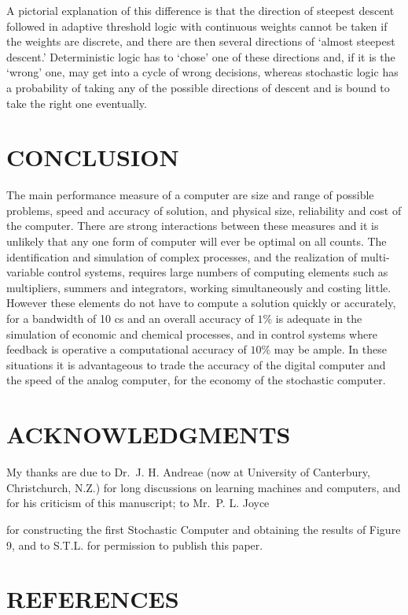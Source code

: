 \documentclass[
  10
]{article}
\begin{document}
A pictorial explanation of this difference is that the direction of
steepest descent followed in adaptive threshold logic with continuous
weights cannot be taken if the weights are discrete, and there are then
several directions of `almost steepest descent.' Deterministic logic has
to `chose' one of these directions and, if it is the `wrong' one, may
get into a cycle of wrong decisions, whereas stochastic logic has a
probability of taking any of the possible directions of descent and is
bound to take the right one eventually.

\section{CONCLUSION}\label{conclusion}

The main performance measure of a computer are size and range of
possible problems, speed and accuracy of solution, and physical size,
reliability and cost of the computer. There are strong interactions
between these measures and it is unlikely that any one form of computer
will ever be optimal on all counts. The identification and simulation of
complex processes, and the realization of multi-variable control
systems, requires large numbers of computing elements such as
multipliers, summers and integrators, working simultaneously and costing
little. However these elements do not have to compute a solution quickly
or accurately, for a bandwidth of 10 cs and an overall accuracy of
\(1\%\) is adequate in the simulation of economic and chemical
processes, and in control systems where feedback is operative a
computational accuracy of \(10\%\) may be ample. In these situations it
is advantageous to trade the accuracy of the digital computer and the
speed of the analog computer, for the economy of the stochastic
computer.

\section{ACKNOWLEDGMENTS}\label{acknowledgments}

My thanks are due to Dr.~J. H. Andreae (now at University of Canterbury,
Christchurch, N.Z.) for long discussions on learning machines and
computers, and for his criticism of this manuscript; to Mr.~P. L. Joyce

for constructing the first Stochastic Computer and obtaining the results
of Figure 9, and to S.T.L. for permission to publish this paper.

\section{REFERENCES}\label{references}
\end{document}
